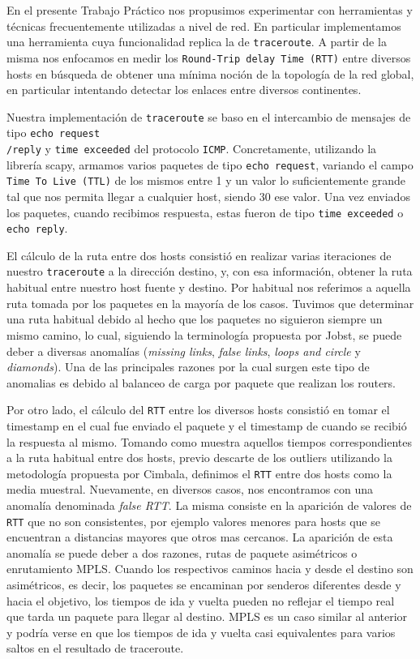 En el presente Trabajo Práctico nos propusimos experimentar con herramientas y técnicas frecuentemente utilizadas a nivel de red. En particular implementamos una herramienta cuya funcionalidad replica la de \texttt{traceroute}. A partir de la misma nos enfocamos en medir los \texttt{Round-Trip delay Time (RTT)} entre diversos hosts en búsqueda de obtener una mínima noción de la topología de la red global, en particular intentando detectar los enlaces entre diversos continentes.

Nuestra implementación de \texttt{traceroute} se baso en el intercambio de mensajes de tipo \texttt{echo request\\/reply} y \texttt{time exceeded} del protocolo \texttt{ICMP}. Concretamente, utilizando la librería scapy, armamos varios paquetes de tipo \texttt{echo request}, variando el campo \texttt{Time To Live (TTL)} de los mismos entre 1 y un valor lo suficientemente grande tal que nos permita llegar a cualquier host, siendo 30 ese valor. Una vez enviados los paquetes, cuando recibimos respuesta, estas fueron de tipo \texttt{time exceeded} o \texttt{echo reply}.

El cálculo de la ruta entre dos hosts consistió en realizar varias iteraciones de nuestro \texttt{traceroute} a la dirección destino, y, con esa información, obtener la ruta habitual entre nuestro host fuente y destino. Por habitual nos referimos a aquella ruta tomada por los paquetes en la mayoría de los casos. Tuvimos que determinar una ruta habitual debido al hecho que los paquetes no siguieron siempre un mismo camino, lo cual, siguiendo la terminología propuesta por Jobst, se puede deber a diversas anomalías (\textit{missing links}, \textit{false links}, \textit{loops and circle} y \textit{diamonds}).
Una de las principales razones por la cual surgen este tipo de anomalias es debido al balanceo de carga por paquete que realizan los routers.

Por otro lado, el cálculo del \texttt{RTT} entre los diversos hosts consistió en tomar el timestamp en el cual fue enviado el paquete y el timestamp de cuando se recibió la respuesta al mismo. Tomando como muestra aquellos tiempos correspondientes a la ruta habitual entre dos hosts, previo descarte de los outliers utilizando la metodología propuesta por Cimbala, definimos el \texttt{RTT} entre dos hosts como la media muestral. Nuevamente, en diversos casos, nos encontramos con una anomalía denominada \textit{false RTT}. La misma consiste en la aparición de valores de \texttt{RTT} que no son consistentes, por ejemplo valores menores para hosts que se encuentran a distancias mayores que otros mas cercanos. La aparición de esta anomalía se puede deber a dos razones, rutas de paquete asimétricos o enrutamiento MPLS. Cuando los respectivos caminos hacia y desde el destino son asimétricos, es decir, los paquetes se encaminan por senderos diferentes desde y hacia el objetivo, los tiempos de ida y vuelta pueden no reflejar el tiempo real que tarda un paquete para llegar al destino. MPLS es un caso similar al anterior y podría verse en que los tiempos de ida y vuelta casi equivalentes para varios saltos en el resultado de traceroute.

